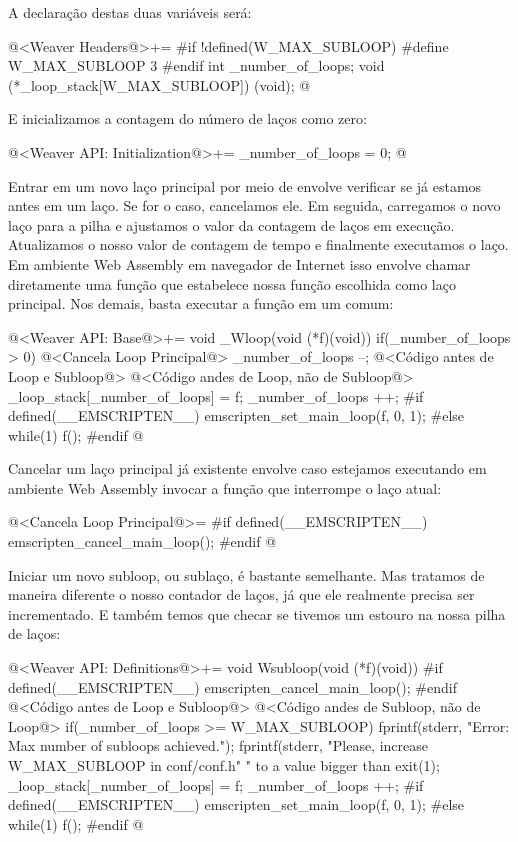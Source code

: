 A declaração destas duas variáveis será:

\iniciocodigo
@<Weaver Headers@>+=
#if !defined(W_MAX_SUBLOOP)
#define W_MAX_SUBLOOP 3
#endif
int _number_of_loops;
void (*_loop_stack[W_MAX_SUBLOOP]) (void);
@
\fimcodigo

E inicializamos a contagem do número de laços como zero:

\iniciocodigo
@<Weaver API: Initialization@>+=
_number_of_loops = 0;
@
\fimcodigo

Entrar em um novo laço principal por meio de 
envolve verificar se já estamos antes em um laço. Se for o caso,
cancelamos ele. Em seguida, carregamos o novo laço para a pilha e
ajustamos o valor da contagem de laços em execução. Atualizamos o
nosso valor de contagem de tempo e finalmente executamos o laço. Em
ambiente Web Assembly em navegador de Internet isso envolve chamar
diretamente uma função que estabelece nossa função escolhida como laço
principal. Nos demais, basta executar a função em
um  comum:

\iniciocodigo
@<Weaver API: Base@>+=
void _Wloop(void (*f)(void)){
  if(_number_of_loops > 0){
    @<Cancela Loop Principal@>
    _number_of_loops --;
  }
  @<Código antes de Loop e Subloop@>
  @<Código andes de Loop, não de Subloop@>
  _loop_stack[_number_of_loops] = f;
  _number_of_loops ++;
#if defined(__EMSCRIPTEN__)
  emscripten_set_main_loop(f, 0, 1);
#else
  while(1)
    f();
#endif
}
@
\fimcodigo

Cancelar um laço principal já existente envolve caso estejamos
executando em ambiente Web Assembly invocar a função que interrompe o
laço atual:

\iniciocodigo
@<Cancela Loop Principal@>=
#if defined(__EMSCRIPTEN__)
emscripten_cancel_main_loop();
#endif
@
\fimcodigo

Iniciar um novo subloop, ou sublaço, é bastante semelhante. Mas
tratamos de maneira diferente o nosso contador de laços, já que ele
realmente precisa ser incrementado. E também temos que checar se
tivemos um estouro na nossa pilha de laços:

\iniciocodigo
@<Weaver API: Definitions@>+=
void Wsubloop(void (*f)(void)){
#if defined(__EMSCRIPTEN__)
    emscripten_cancel_main_loop();
#endif
  @<Código antes de Loop e Subloop@>
  @<Código andes de Subloop, não de Loop@>
  if(_number_of_loops >= W_MAX_SUBLOOP){
    fprintf(stderr, "Error: Max number of subloops achieved.\n");
    fprintf(stderr, "Please, increase W_MAX_SUBLOOP in conf/conf.h"
            " to a value bigger than %
    exit(1);
  }
  _loop_stack[_number_of_loops] = f;
  _number_of_loops ++;
#if defined(__EMSCRIPTEN__)
  emscripten_set_main_loop(f, 0, 1);
#else
  while(1)
    f();
#endif
}
@
\fimcodigo

